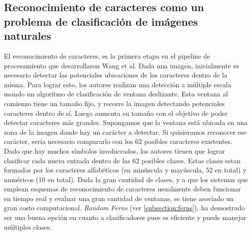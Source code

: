 \subsection{Reconocimiento de caracteres como un problema de clasificación de imágenes naturales}
\label{subsection: wang_recon_caracteres}
	
	El reconocimiento de caracteres, es la primera etapa en el pipeline de procesamiento que desarrollaron Wang et al. Dada una imagen, inicialmente es necesario detectar las potenciales ubicaciones de los caracteres dentro de la misma. Para lograr esto, los autores realizan una detección a múltiple escala usando un algoritmo de clasificación de ventana deslizante. Esta ventana al comienzo tiene un tamaño fijo, y  recorre la imagen detectando potenciales caracteres dentro de sí. Luego aumenta su tamaño con el objetivo de poder detectar caracteres más grandes. Supongamos que la ventana está ubicada en una zona de la imagen donde hay un carácter a detectar. Si quisieramos reconocer ese carácter, sería necesario compararlo con los 62 posibles caracteres existentes. Dado que hay muchos símbolos involucrados, los autores tienen que lograr clasificar cada nueva entrada dentro de las 62 posibles clases. Estas clases estan formadas por los caracteres alfabéticos (en minúscula y mayúscula, 52 en total) y numéricos (10 en total). Dada la gran cantidad de clases, y a que los sistemas que emplean esquemas de reconocimiento de caracteres usualmente deben funcionar en tiempo real y evaluar una gran cantidad de ventanas, se tiene asociado un gran costo computacional. \textit{Random Ferns} (ver \ref{subsection:ferns}), ha demostrado ser una buena opción en cuanto a clasificadores pues es eficiente y puede manejar múltiples clases.
	
	
